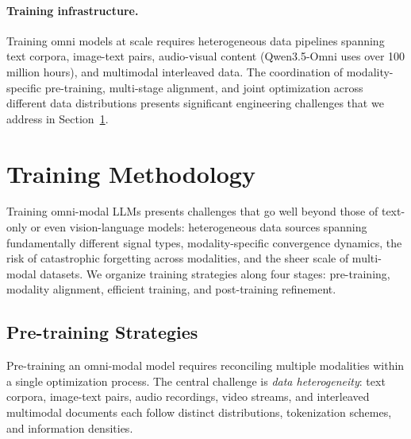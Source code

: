 \documentclass{article}
\begin{document}
\paragraph{Training infrastructure.}
Training omni models at scale requires heterogeneous data pipelines spanning text corpora, image-text pairs, audio-visual content (Qwen3.5-Omni uses over 100 million hours), and multimodal interleaved data.
The coordination of modality-specific pre-training, multi-stage alignment, and joint optimization across different data distributions presents significant engineering challenges that we address in Section~\ref{sec:training}.

\section{Training Methodology}
\label{sec:training}

Training omni-modal LLMs presents challenges that go well beyond those of text-only or even vision-language models: heterogeneous data sources spanning fundamentally different signal types, modality-specific convergence dynamics, the risk of catastrophic forgetting across modalities, and the sheer scale of multi-modal datasets.
We organize training strategies along four stages: pre-training, modality alignment, efficient training, and post-training refinement.

\subsection{Pre-training Strategies}

Pre-training an omni-modal model requires reconciling multiple modalities within a single optimization process.
The central challenge is \emph{data heterogeneity}: text corpora, image-text pairs, audio recordings, video streams, and interleaved multimodal documents each follow distinct distributions, tokenization schemes, and information densities.
\end{document}

